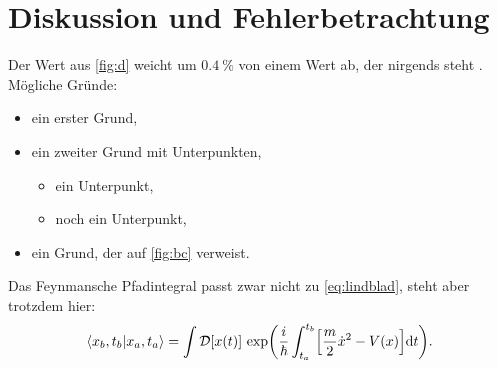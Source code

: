 \section{Diskussion und Fehlerbetrachtung}

\blindtext

Der Wert aus \cref{fig:d} weicht um $\qty{0.4}{\percent}$ von einem Wert
ab, der nirgends steht \cite{zinth_optik_2018}. Mögliche Gründe:
\begin{itemize}
  \item ein erster Grund,
  \item ein zweiter Grund mit Unterpunkten,
    \begin{itemize}
      \item ein Unterpunkt,
      \item noch ein Unterpunkt,
    \end{itemize}
  \item ein Grund, der auf \cref{fig:bc} verweist.
\end{itemize}

Das Feynmansche Pfadintegral passt zwar nicht zu \cref{eq:lindblad},
steht aber trotzdem hier:
\begin{equation}
  \langle x_{b}, t_{b} \vert x_{a}, t_{a} \rangle
  = \int \mathcal{D}[x(t)]\,
    \exp\biggl( \frac{i}{\hbar} \int_{t_{a}}^{t_{b}}
    \Bigl[ \frac{m}{2}\dot x^{2} - V(x) \Bigr] \mathrm{d}t \biggr) .
  \label{eq:pfadintegral}
\end{equation}

\blindtext
